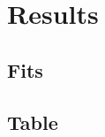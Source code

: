 \documentclass[9pt]{beamer}
\begin{document}
	\section{Results}
		\subsection{Fits}
			
			
			
			
			
			
			
			
			
			
			
			
		\subsection{Table}
			


%
\end{document}
